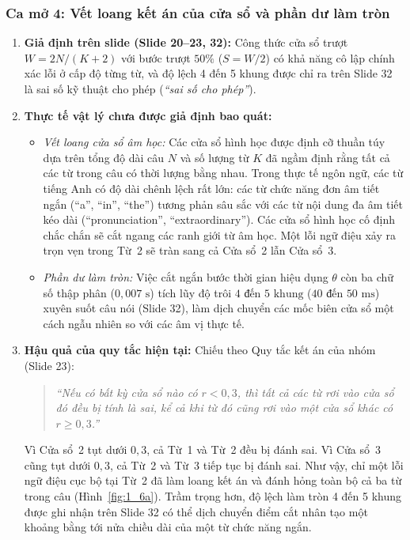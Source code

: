 \documentclass[11pt,a4paper]{article}
\begin{document}
\subsubsection*{Ca mở 4: Vết loang kết án của cửa sổ và phần dư làm tròn}

\begin{enumerate}
    \item \textbf{Giả định trên slide (Slide 20--23, 32):} Công thức cửa sổ trượt $W = 2N/(K+2)$ với bước trượt $50\%$ ($S = W/2$) có khả năng cô lập chính xác lỗi ở cấp độ từng từ, và độ lệch 4 đến 5 khung được chỉ ra trên Slide 32 là sai số kỹ thuật cho phép (\textit{``sai số cho phép''}).
    \item \textbf{Thực tế vật lý chưa được giả định bao quát:}
    \begin{itemize}
        \item \textit{Vết loang cửa sổ âm học:} Các cửa sổ hình học được định cỡ thuần túy dựa trên tổng độ dài câu $N$ và số lượng từ $K$ đã ngầm định rằng tất cả các từ trong câu có thời lượng bằng nhau. Trong thực tế ngôn ngữ, các từ tiếng Anh có độ dài chênh lệch rất lớn: các từ chức năng đơn âm tiết ngắn (``a'', ``in'', ``the'') tương phản sâu sắc với các từ nội dung đa âm tiết kéo dài (``pronunciation'', ``extraordinary''). Các cửa sổ hình học cố định chắc chắn sẽ cắt ngang các ranh giới từ âm học. Một lỗi ngữ điệu xảy ra trọn vẹn trong Từ~2 sẽ tràn sang cả Cửa sổ~2 lẫn Cửa sổ~3.
        \item \textit{Phần dư làm tròn:} Việc cắt ngắn bước thời gian hiệu dụng $\theta$ còn ba chữ số thập phân ($0{,}007\text{ s}$) tích lũy độ trôi $4\text{ đến }5\text{ khung}$ ($40\text{ đến }50\text{ ms}$) xuyên suốt câu nói (Slide 32), làm dịch chuyển các mốc biên cửa sổ một cách ngẫu nhiên so với các âm vị thực tế.
    \end{itemize}
    \item \textbf{Hậu quả của quy tắc hiện tại:} Chiếu theo Quy tắc kết án của nhóm (Slide 23):
    \begin{quote}
    \textit{``Nếu có bất kỳ cửa sổ nào có $r < 0{,}3$, thì tất cả các từ rơi vào cửa sổ đó đều bị tính là sai, kể cả khi từ đó cũng rơi vào một cửa sổ khác có $r \ge 0{,}3$.''}
    \end{quote}
    Vì Cửa sổ~2 tụt dưới $0{,}3$, cả Từ~1 và Từ~2 đều bị đánh sai. Vì Cửa sổ~3 cũng tụt dưới $0{,}3$, cả Từ~2 và Từ~3 tiếp tục bị đánh sai. Như vậy, chỉ một lỗi ngữ điệu cục bộ tại Từ~2 đã làm loang kết án và đánh hỏng toàn bộ cả ba từ trong câu (Hình~\ref{fig:1_6a}). Trầm trọng hơn, độ lệch làm tròn 4 đến 5 khung được ghi nhận trên Slide 32 có thể dịch chuyển điểm cắt nhân tạo một khoảng bằng tới nửa chiều dài của một từ chức năng ngắn.

\end{enumerate}
\end{document}
